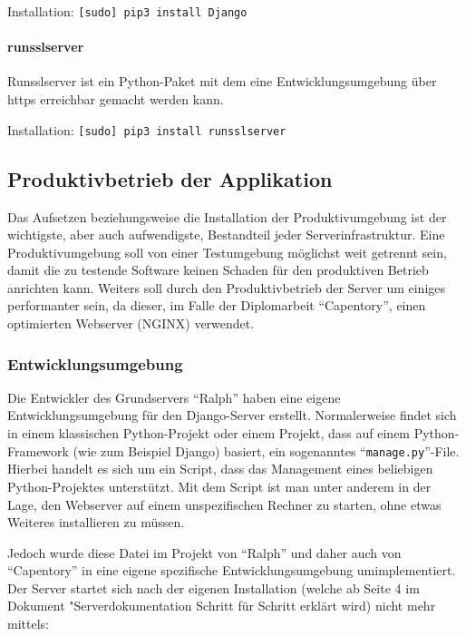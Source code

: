 Installation: \texttt{{[}sudo{]}\ pip3\ install\ Django}

\hypertarget{runsslserver}{%
\paragraph{runsslserver}\label{runsslserver}}

Runsslserver ist ein Python-Paket mit dem eine Entwicklungsumgebung über
https erreichbar gemacht werden kann.

Installation: \texttt{{[}sudo{]}\ pip3\ install\ runsslserver}

\hypertarget{produktivbetrieb-der-applikation}{%
\subsection{Produktivbetrieb der
Applikation}\label{produktivbetrieb-der-applikation}}

Das Aufsetzen beziehungsweise die Installation der Produktivumgebung ist
der wichtigste, aber auch aufwendigste, Bestandteil jeder
Serverinfrastruktur. Eine Produktivumgebung soll von einer Testumgebung
möglichst weit getrennt sein, damit die zu testende Software keinen
Schaden für den produktiven Betrieb anrichten kann. Weiters soll durch
den Produktivbetrieb der Server um einiges performanter sein, da dieser,
im Falle der Diplomarbeit ``Capentory'', einen optimierten Webserver
(NGINX) verwendet.

\hypertarget{entwicklungsumgebung}{%
\subsubsection{Entwicklungsumgebung}\label{entwicklungsumgebung}}

Die Entwickler des Grundservers ``Ralph'' haben eine eigene
Entwicklungsumgebung für den Django-Server erstellt. Normalerweise
findet sich in einem klassischen Python-Projekt oder einem Projekt, dass
auf einem Python-Framework (wie zum Beispiel Django) basiert, ein
sogenanntes ``\texttt{manage.py}''-File. Hierbei handelt es sich um ein
Script, dass das Management eines beliebigen Python-Projektes
unterstützt. Mit dem Script ist man unter anderem in der Lage, den
Webserver auf einem unspezifischen Rechner zu starten, ohne etwas
Weiteres installieren zu müssen.

Jedoch wurde diese Datei im Projekt von ``Ralph'' und daher auch von
``Capentory'' in eine eigene spezifische Entwicklungsumgebung
umimplementiert. Der Server startet sich nach der eigenen Installation
(welche ab Seite 4 im Dokument "Serverdokumentation Schritt für Schritt
erklärt wird) nicht mehr mittels:

